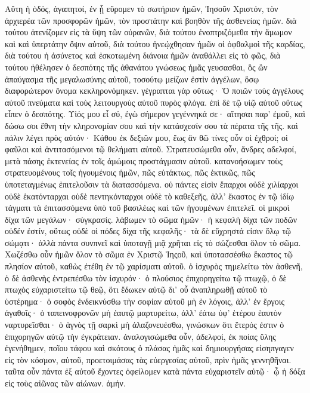 Αὕτη ἡ ὁδός, ἀγαπητοί, ἐν ᾗ εὕρομεν τὸ σωτήριον ἡμῶν, Ἰησοῦν Χριστόν, τὸν ἀρχιερέα τῶν προσφορῶν ἡμῶν, τὸν προστάτην καὶ βοηθὸν τῆς ἀσθενείας ἡμῶν. διὰ τούτου ἀτενίζομεν εἰς τὰ ὕψη τῶν οὐρανῶν, διὰ τούτου ἐνοπτριζόμεθα τὴν ἄμωμον καὶ καὶ ὑπερτάτην ὄψιν αὐτοῦ, διὰ τούτου ἠνεῴχθησαν ἡμῶν οἱ ὀφθαλμοὶ τῆς καρδίας, διὰ τούτου ἡ ἀσύνετος καὶ ἐσκοτωμένη διάνοια ἡμῶν ἀναθάλλει εἰς τὸ φῶς, διὰ τούτου ἠθέλησεν ὁ δεσπότης τῆς ἀθανάτου γνώσεως ἡμᾶς γευσασθαι, ὃς ὢν ἀπαύγασμα τῆς μεγαλωσύνης αὐτοῦ, τοσούτῳ μείζων ἐστὶν ἀγγέλων, ὅσῳ διαφορώτερον ὄνομα κεκληρονόμηκεν. γέγραπται γὰρ οὕτως· Ὁ ποιῶν τοὺς ἀγγέλους αὐτοῦ πνεύματα καὶ τοὺς λειτουργοὺς αὐτοῦ πυρὸς φλόγα. ἐπὶ δὲ τῷ υἱῷ αὐτοῦ οὕτως εἶπεν ὁ δεσπότης. Υἱός μου εἶ σύ, ἐγὼ σήμερον γεγέννηκά σε· αἴτησαι παρ’ ἐμοῦ, καὶ δώσω σοι ἔθνη τὴν κληρονομίαν σου καὶ τὴν κατάσχεσίν σου τὰ πέρατα τῆς τῆς. καὶ πάλιν λέγει πρὸς αὐτόν· Κάθου ἐκ δεξιῶν μου, ἕως ἂν θῶ τίνες οὖν οἱ ἐχθροί; οἱ φαῦλοι καὶ ἀντιτασόμενοι τῷ θελήματι αὐτοῦ.
Στρατευσώμεθα οὖν, ἄνδρες αδελφοί, μετὰ πάσης ἐκτενείας ἐν τοῖς ἀμώμοις προστάγμασιν αὐτοῦ. κατανοήσωμεν τοὺς στρατευομένους τοῖς ἡγουμένοις ἡμῶν, πῶς εὐτάκτως, πῶς ἑκτικῶς, πῶς ὑποτεταγμένως ἐπιτελοῦσιν τὰ διατασσόμενα. οὐ πάντες εἰσὶν ἔπαρχοι οὐδὲ χιλίαρχοι οὐδὲ ἑκατόνταρχαι οὐδὲ πεντηκόνταρχοι οὐδὲ τὸ καθεξεῆς, ἀλλ’ ἕκαστος ἐν τῷ ἰδίῳ τάγματι τὰ ἐπιτασσόμενα ὑπὸ τοῦ βασιλέως καὶ τῶν ἡγουμένων ἐπιτελεῖ. οἱ μικροὶ δίχα τῶν μεγάλων· σύγκρασίς. λάβωμεν τὸ σῶμα ἡμῶν· ἡ κεφαλὴ δίχα τῶν ποδῶν οὐδέν ἐστίν, οὕτως οὐδὲ οἱ πόδες δίχα τῆς κεφαλῆς· τὰ δὲ εὔχρηστά εἰσιν ὅλῳ τῷ σώμᾳτι· ἀλλὰ πάντα συνπνεῖ καὶ ὑποταγῇ μιᾷ χρῆται εἰς τὸ σώζεσθαι ὅλον τὸ σῶμα.
Χωζέσθω οὖν ἡμῶν ὅλον τὸ σῶμα ἐν Χριστῷ Ἰηςοῦ, καὶ ὑποτασσέσθω ἕκαστος τῷ πλησίον αὐτοῦ, καθὼς ἐτέθη ἐν τῷ χαρίσματι αὐτοῦ. ὁ ἰσχυρὸς τημελείτω τὸν ἀσθενῆ, ὁ δὲ ἀσθενὴς ἐντρεπέσθω τὸν ἰσχυρόν· ὁ πλούσιος ἐπιχορηγείτω τῷ πτωχῷ, ὁ δὲ πτωχὸς εὐχαριστείτω τῷ θεῷ, ὅτι ἔδωκεν αὐτῷ δι’ οὗ ἀναπληρωθῇ αὐτοῦ τὸ ὑστέρημα· ὁ σοφὸς ἐνδεικνύσθω τὴν σοφίαν αὐτοῦ μὴ ἐν λόγοις, ἀλλ’ ἐν ἔργοις ἀγαθοῖς· ὁ ταπεινοφρονῶν μὴ ἐαυτῷ μαρτυρείτω, ἀλλ’ ἐάτω ὑφ’ ἑτέρου ἑαυτὸν ναρτυρεῖσθαι· ὁ ἁγνὸς τῇ σαρκὶ μὴ ἀλαζονευέσθω, γινώσκων ὅτι ἕτερός ἐστιν ὁ ἐπιχορηγῶν αὐτῷ τὴν ἐγκράτειαν. ἀναλογισώμεθα οὖν, ἀδελφοί, ἐκ ποίας ὕλης ἐγενήθημεν, ποῖου τάφου καὶ σκότους ὁ πλάσας ἡμᾶς καὶ δημιουργήσας εἰσηπγαγεν εἰς τὸν κόσμον, αὐτοῦ, προετοιμάσας τὰς εὐεργεσίας αὐτοῦ, πρὶν ἡμᾶς γεννηθῆναι. ταῦτα οὖν πάντα ἐξ αὐτοῦ ἔχοντες ὀφείλομεν κατὰ πάντα εὐχαριστεῖν αὐτῷ· ᾧ ἡ δόξα εἰς τοὺς αἰῶνας τῶν αἰώνων. ἀμήν.
